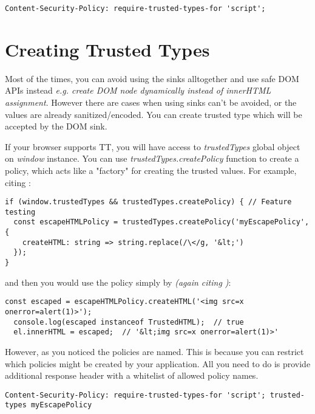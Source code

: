 \bigskip
\begin{lstlisting}[language={}, caption={Restricting policy names}]
  Content-Security-Policy: require-trusted-types-for 'script';
\end{lstlisting}

\section{Creating Trusted Types}

Most of the times, you can avoid using the sinks alltogether and use safe DOM APIs instead
\emph{e.g. create DOM node dynamically instead of innerHTML assignment}. However there are cases
when using sinks can't be avoided, or the values are already sanitized/encoded. You can create
trusted type which will be accepted by the DOM sink.

If your browser supports TT, you will have access to \emph{trustedTypes} global object on
\emph{window} instance. You can use \emph{trustedTypes.createPolicy} function to create a policy,
which acts like a "factory" for creating the trusted values. For example, citing
\cite{trusted_types_into}:

\bigskip
\begin{lstlisting}[language=ES6, caption={Creating Trusted Types policy}]
  if (window.trustedTypes && trustedTypes.createPolicy) { // Feature testing
  const escapeHTMLPolicy = trustedTypes.createPolicy('myEscapePolicy', {
    createHTML: string => string.replace(/\</g, '&lt;')
  });
}
\end{lstlisting}

and then you would use the policy simply by \emph{(again citing \cite{trusted_types_into})}:

\bigskip
\begin{lstlisting}[language=ES6, caption={Using the policy to create Trusted value}]
  const escaped = escapeHTMLPolicy.createHTML('<img src=x onerror=alert(1)>');
  console.log(escaped instanceof TrustedHTML);  // true
  el.innerHTML = escaped;  // '&lt;img src=x onerror=alert(1)>'
\end{lstlisting}

However, as you noticed the policies are named. This is because you can restrict which policies
might be created by your application. All you need to do is provide additional response header with
a whitelist of allowed policy names.

\bigskip
\begin{lstlisting}[language={}, caption={Restricting policy names}]
  Content-Security-Policy: require-trusted-types-for 'script'; trusted-types myEscapePolicy
\end{lstlisting}

